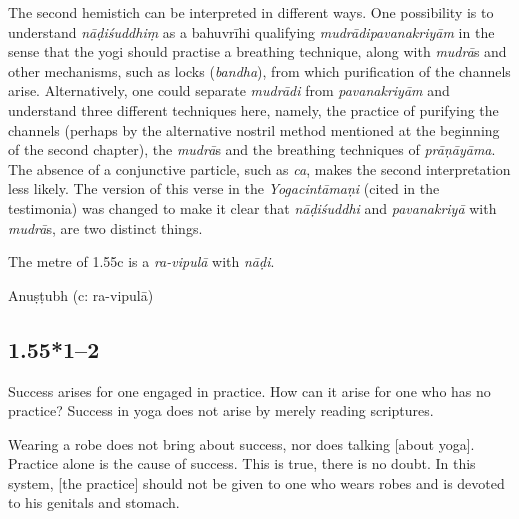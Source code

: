 \begin{ekdosis}
\begin{testimonia}[hp01_055]
\end{testimonia}

\begin{philcomm}[hp01_055]
The second hemistich can be interpreted in different ways. One possibility is to understand \emph{nāḍiśuddhiṃ} as a bahuvrīhi qualifying \emph{mudrādipavanakriyām} in the sense that the yogi should practise a breathing technique, along with \emph{mudrā}s and other mechanisms, such as locks (\emph{bandha}), from which purification of the channels arise. Alternatively, one could separate \emph{mudrādi} from \emph{pavanakriyām} and understand three different techniques here, namely, the practice of purifying the channels (perhaps by the alternative nostril method mentioned at the beginning of the second chapter), the \emph{mudrā}s and the breathing techniques of \emph{prāṇāyāma}. The absence of a conjunctive particle, such as \emph{ca}, makes the second interpretation less likely. The version of this verse in the \emph{Yogacintāmaṇi} (cited in the testimonia) was changed to make it clear that \emph{nāḍiśuddhi} and \emph{pavanakriyā} with \emph{mudrā}s, are two distinct things. 

The metre of 1.55c is a \emph{ra-vipulā} with \emph{nāḍi}.%
\end{philcomm}

\begin{metre}[hp01_055]
Anuṣṭubh (c: ra-vipulā)
\end{metre}

\subsection*{1.55*1--2}
\begin{translation}[hp01_055_1]
Success arises for one engaged in practice. How can it arise for one who has no practice? Success in yoga does not arise by merely reading scriptures.
\end{translation}

\begin{translation}[hp01_055_2]
Wearing a robe does not bring about success, nor does talking [about yoga]. Practice alone is the cause of success. This is true, there is no doubt. In this system, [the practice] should not be given to one who wears robes and is devoted to his genitals and stomach.%
\end{translation}


\end{ekdosis}

